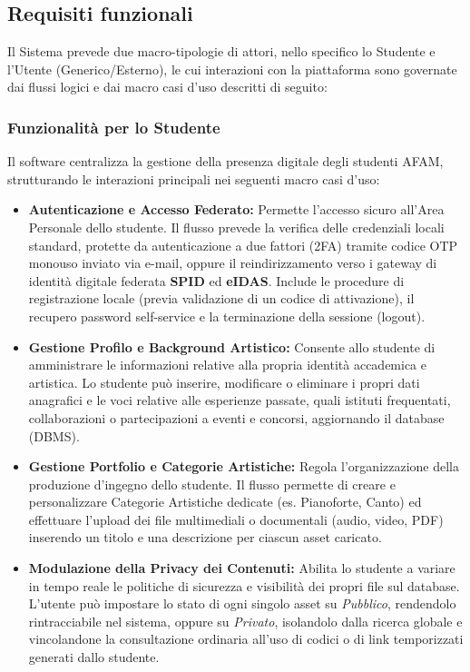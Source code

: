 \documentclass[12pt,a4paper]{article}
\begin{document}
\subsection{Requisiti funzionali}
Il Sistema prevede due macro-tipologie di attori, nello specifico lo Studente e l'Utente (Generico/Esterno), le cui interazioni con la piattaforma sono governate dai flussi logici e dai macro casi d'uso descritti di seguito:

\subsubsection{Funzionalità per lo Studente}
Il software centralizza la gestione della presenza digitale degli studenti AFAM, strutturando le interazioni principali nei seguenti macro casi d'uso:

\begin{itemize}
    \item \textbf{Autenticazione e Accesso Federato:} Permette l'accesso sicuro all'Area Personale dello studente. Il flusso prevede la verifica delle credenziali locali standard, protette da autenticazione a due fattori (2FA) tramite codice OTP monouso inviato via e-mail, oppure il reindirizzamento verso i gateway di identità digitale federata \textbf{SPID} ed \textbf{eIDAS}. Include le procedure di registrazione locale (previa validazione di un codice di attivazione), il recupero password self-service e la terminazione della sessione (logout).
    \item \textbf{Gestione Profilo e Background Artistico:} Consente allo studente di amministrare le informazioni relative alla propria identità accademica e artistica. Lo studente può inserire, modificare o eliminare i propri dati anagrafici e le voci relative alle esperienze passate, quali istituti frequentati, collaborazioni o partecipazioni a eventi e concorsi, aggiornando il database (DBMS).
    \item \textbf{Gestione Portfolio e Categorie Artistiche:} Regola l'organizzazione della produzione d'ingegno dello studente. Il flusso permette di creare e personalizzare Categorie Artistiche dedicate (es. Pianoforte, Canto) ed effettuare l'upload dei file multimediali o documentali (audio, video, PDF) inserendo un titolo e una descrizione per ciascun asset caricato.
    \item \textbf{Modulazione della Privacy dei Contenuti:} Abilita lo studente a variare in tempo reale le politiche di sicurezza e visibilità dei propri file sul database. L'utente può impostare lo stato di ogni singolo asset su \textit{Pubblico}, rendendolo rintracciabile nel sistema, oppure su \textit{Privato}, isolandolo dalla ricerca globale e vincolandone la consultazione ordinaria all'uso di codici o di link temporizzati generati dallo studente.

\end{itemize}
\end{document}
